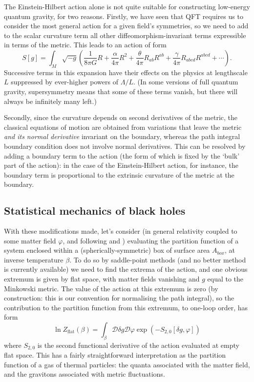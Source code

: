 \documentclass{article}
\newcommand{\mc}[1]{\ensuremath{\mathcal{#1}}}
\newcommand{\be}{\begin{equation}}
\newcommand{\ee}{\end{equation}}
\begin{document}
The Einstein-Hilbert action alone is not quite suitable for constructing low-energy quantum gravity, for two reasons. Firstly, we have seen that QFT requires us to consider the most general action for a given field's symmetries, so we need to add to the scalar curvature term all other diffeomorphism-invariant terms expressible in terms of the metric. This leads to an action of form
\be \label{generalisedaction}
S[g] = \int_M \sqrt{-g} \left( \frac{1}{8\pi G}  R  + \frac{\alpha}{4\pi} R^2 + \frac{\theta}{4\pi}R_{ab}R^{ab} + \frac{\gamma}{4\pi}R_{abcd}R^{abcd}+\cdots \right).
\ee
Successive terms in this expansion have their effects on the physics at lengthscale $L$ suppressed by ever-higher powers of $\Lambda/L$. (In some versions of full quantum gravity, supersymmetry means that some of these terms vanish, but there will always be infinitely many left.)

Secondly, since the curvature depends on second derivatives of the metric, the classical equations of motion are obtained from variations that leave the metric \emph{and its normal derivative} invariant on the boundary, whereas the path integral boundary condition does not involve normal derivatives. This can be resolved by adding a boundary term to the action (the form of which is fixed by the `bulk' part of the action): in the case of the Einstein-Hilbert action, for instance, the boundary term is proportional to the extrinsic curvature of the metric at the boundary.

\subsection{Statistical mechanics of black holes}

With these modifications made, let's consider (in general relativity coupled to some matter field $\varphi$, and following  and ) evaluating the partition function  of a system enclosed within a (spherically-symmetric) box of surface area $A_{box}$, at inverse temperature $\beta$. To do so by saddle-point methods (and no better method is currently available) we need to find the extrema of the action, and one obvious extremum is given by flat space, with matter fields vanishing and $g$ equal to the Minkowski metric. The value of the action at this extremum is zero (by construction: this is our convention for normalising the path integral), so the contribution to the partition function from this extremum, to one-loop order, has form
\be
\ln Z_{\mbox{flat}}(\beta) =  \int_\beta \mc{D}\delta g \mc{D}\varphi \exp(- S_{2,0}[\delta g,\varphi])
\ee
where $S_{2,0}$ is the second functional derivative of the action evaluated at empty flat space.
This has a fairly straightforward interpretation as the partition function of a gas of thermal particles: the quanta associated with the matter field, and the gravitons associated with metric fluctuations. 
\end{document}
